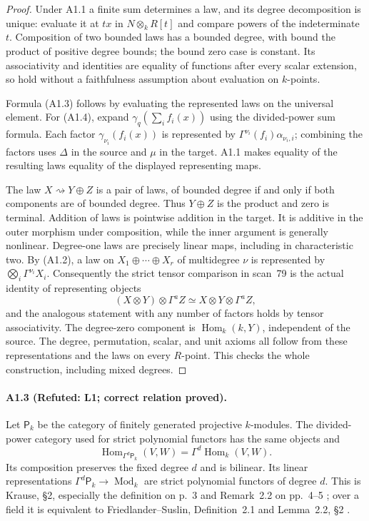 \begin{proof}
Under A1.1 a finite sum determines a law, and its degree decomposition is
unique: evaluate it at $tx$ in $N\otimes_k R[t]$ and compare powers of
the indeterminate $t$. Composition of two bounded laws has a bounded
degree, with bound the product of positive degree bounds; the bound zero
case is constant. Its associativity and identities are equality of
functions after every scalar extension, so hold without a faithfulness
assumption about evaluation on $k$-points.

Formula (A1.3) follows by evaluating the represented laws on the universal
element. For (A1.4), expand
$\gamma_q(\sum_i f_i(x))$ using the divided-power sum formula. Each
factor $\gamma_{\nu_i}(f_i(x))$ is represented by
$\Gamma^{\nu_i}(f_i)\alpha_{\nu_i,i}$; combining the factors uses
$\Delta$ in the source and $\mu$ in the target. A1.1 makes equality of
the resulting laws equality of the displayed representing maps.

The law $X\rightsquigarrow Y\oplus Z$ is a pair of laws, of bounded
degree if and only if both components are of bounded degree. Thus
$Y\oplus Z$ is the product and zero is terminal. Addition of laws is
pointwise addition in the target. It is additive in the outer morphism
under composition, while the inner argument is generally nonlinear.
Degree-one laws are precisely linear maps, including in characteristic
two. By (A1.2), a law on $X_1\oplus\cdots\oplus X_r$ of multidegree
$\nu$ is represented by $\bigotimes_i\Gamma^{\nu_i}X_i$.
Consequently the strict tensor comparison in scan~79 is the actual
identity of representing objects
\[
 (X\otimes Y)\otimes\Gamma^a Z
       \simeq X\otimes Y\otimes\Gamma^a Z,
\]
and the analogous statement with any number of factors holds by tensor
associativity. The degree-zero component is $\operatorname{Hom}_k(k,Y)$,
independent of the source. The degree, permutation, scalar, and unit
axioms all follow from these representations and the laws on every
$R$-point. This checks the whole construction, including mixed degrees.
\end{proof}

\paragraph{A1.3 (Refuted: L1; correct relation proved).}
Let $\mathsf P_k$ be the category of finitely generated projective
$k$-modules. The divided-power category used for strict polynomial
functors has the same objects and
\[
 \operatorname{Hom}_{\Gamma^d\mathsf P_k}(V,W)
       =\Gamma^d\operatorname{Hom}_k(V,W).
 \tag{A1.5}
\]
Its composition preserves the fixed degree $d$ and is bilinear. Its
linear representations $\Gamma^d\mathsf P_k\to\operatorname{Mod}_k$
are strict polynomial functors of degree $d$. This is Krause,
\S2, especially the definition on p.~3 and Remark~2.2 on pp.~4--5
\cite{Krause2013}; over a field it is equivalent to Friedlander--Suslin,
Definition~2.1 and Lemma~2.2, \S2 \cite{FriedlanderSuslin1997}.

